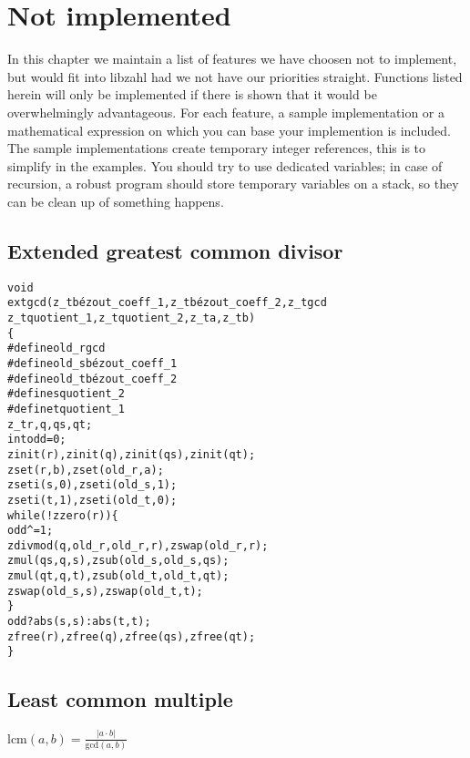\chapter{Not implemented}
\label{chap:Not implemented}

In this chapter we maintain a list of
features we have choosen not to implement,
but would fit into libzahl had we not have
our priorities straight. Functions listed
herein will only be implemented if there
is shown that it would be overwhelmingly
advantageous. For each feature, a sample
implementation or a mathematical expression
on which you can base your implemention
is included. The sample implementations create
temporary integer references, this is to
simplify in the examples. You should try to
use dedicated variables; in case of recursion,
a robust program should store temporary
variables on a stack, so they can be
clean up of something happens.

\vspace{1cm}
\minitoc


\newpage
\section{Extended greatest common divisor}
\label{sec:Extended greatest common divisor}

\begin{alltt}
void
extgcd(z_t bézout_coeff_1, z_t bézout_coeff_2, z_t gcd
       z_t quotient_1, z_t quotient_2, z_t a, z_t b)
\{
#define old_r gcd
#define old_s bézout_coeff_1
#define old_t bézout_coeff_2
#define s quotient_2
#define t quotient_1
    z_t r, q, qs, qt;
    int odd = 0;
    zinit(r), zinit(q), zinit(qs), zinit(qt);
    zset(r, b), zset(old_r, a);
    zseti(s, 0), zseti(old_s, 1);
    zseti(t, 1), zseti(old_t, 0);
    while (!zzero(r)) \{
        odd ^= 1;
        zdivmod(q, old_r, old_r, r), zswap(old_r, r);
        zmul(qs, q, s), zsub(old_s, old_s, qs);
        zmul(qt, q, t), zsub(old_t, old_t, qt);
        zswap(old_s, s), zswap(old_t, t);
    \}
    odd ? abs(s, s) : abs(t, t);
    zfree(r), zfree(q), zfree(qs), zfree(qt);
\}
\end{alltt}


\newpage
\section{Least common multiple}
\label{sec:Least common multiple}

\( \displaystyle{
    \mbox{lcm}(a, b) = \frac{\lvert a \cdot b \rvert}{\mbox{gcd}(a, b)}
}\)


